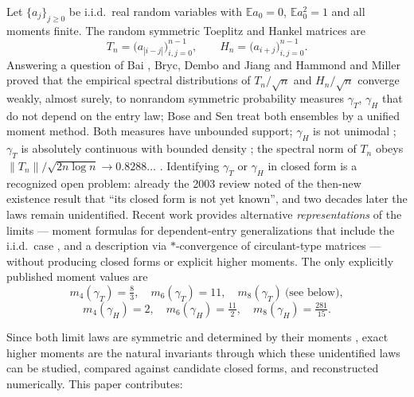 ﻿\documentclass[11pt]{article}
\theoremstyle{remark}
\newcommand{\E}{\mathbb{E}}
\newcommand{\gT}{\gamma_T}
\newcommand{\gH}{\gamma_H}
\begin{document}
Let $\{a_j\}_{j\ge 0}$ be i.i.d.\ real random variables with $\E a_0=0$, $\E a_0^2=1$
and all moments finite. The random symmetric Toeplitz and Hankel matrices are
\[
T_n=\big(a_{|i-j|}\big)_{i,j=0}^{n-1},\qquad
H_n=\big(a_{i+j}\big)_{i,j=0}^{n-1}.
\]
Answering a question of Bai \cite{Bai}, Bryc, Dembo and Jiang \cite{BDJ} and
Hammond and Miller \cite{HM} proved that the empirical spectral distributions of $T_n/\sqrt n$ and $H_n/\sqrt n$ converge weakly,
almost surely, to nonrandom symmetric probability measures $\gT$, $\gH$ that do not
depend on the entry law; Bose and Sen \cite{BoseSen} treat both ensembles by a
unified moment method. Both measures have unbounded support; $\gH$ is not unimodal
\cite{BDJ}; $\gT$ is absolutely continuous with bounded density \cite{SV1}; the spectral
norm of $T_n$ obeys $\|T_n\|/\sqrt{2n\log n}\to 0.8288\ldots$ \cite{Meckes,SV2}.
Identifying $\gT$ or $\gH$ in closed form is a recognized open problem: already the
2003 review \cite{BoseReview} noted of the then-new existence result that ``its
closed form is not yet known'', and two decades later the laws remain unidentified.
Recent work provides alternative \emph{representations} of the limits --- moment
formulas for dependent-entry generalizations that include the i.i.d.\ case
\cite{Maurya}, and a description via $*$-convergence of circulant-type matrices
\cite{BoseVish} --- without producing closed forms or explicit higher moments. The
only explicitly published moment values are
\[
m_4(\gT)=\tfrac83,\quad m_6(\gT)=11,\quad m_8(\gT)\ \text{(see below)},
\]
\[
m_4(\gH)=2,\quad m_6(\gH)=\tfrac{11}2,\quad m_8(\gH)=\tfrac{281}{15}.
\]

Since both limit laws are symmetric and determined by their moments \cite{BDJ}, exact
higher moments are the natural invariants through which these unidentified laws can be
studied, compared against candidate closed forms, and reconstructed numerically. This
paper contributes:
\end{document}
